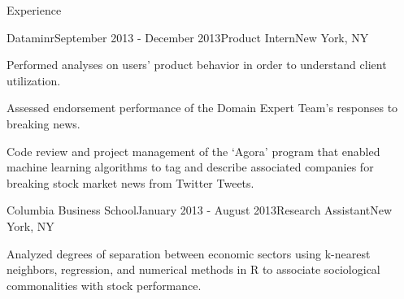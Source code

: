 \documentclass{resume} %
\begin{document}
\begin{rSection}{Experience}
\begin{rSubsection}{Dataminr}{September 2013 - December 2013}{Product Intern}{New York, NY}
\item Performed analyses on users' product behavior in order to understand client utilization.
\item Assessed endorsement performance of the Domain Expert Team's responses to breaking news.
\item Code review and project management of the ‘Agora’ program that enabled machine learning algorithms to tag and describe associated companies for breaking stock market news from Twitter Tweets.
\end{rSubsection}


\begin{rSubsection}{Columbia Business School}{January 2013 - August 2013}{Research Assistant}{New York, NY}
\item Analyzed degrees of separation between economic sectors using k-nearest neighbors, 
regression, and numerical methods in R to associate sociological commonalities with stock performance.
\end{rSubsection}

\end{rSection}


\end{document}
